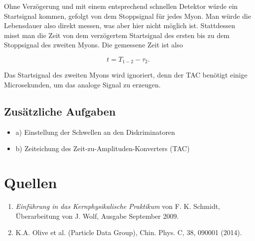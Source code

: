 \documentclass[a4paper,ngerman]{scrartcl}
\begin{document}
Ohne Verzögerung und mit einem entsprechend schnellen Detektor würde ein Startsignal kommen, gefolgt von dem Stoppsignal für jedes Myon. Man würde die Lebensdauer also direkt messen, was aber hier nicht möglich ist. Stattdessen misst man die Zeit von dem verzögertem Startsignal des ersten bis zu dem Stoppsignal des zweiten Myons. Die gemessene Zeit ist also

\begin{equation}
t = T_{1-2} - \tau_2 .
\end{equation}

Das Startsignal des zweiten Myons wird ignoriert, denn der TAC benötigt einige Microsekunden, um das analoge Signal zu erzeugen.



\subsection{Zusätzliche Aufgaben}

\begin{itemize}
\item a) Einstellung der Schwellen an den Diskriminatoren
\item b) Zeiteichung des Zeit-zu-Amplituden-Konverters (TAC)
\end{itemize}



\clearpage
\section{Quellen}
\begin{enumerate}
\item \emph{Einführung in das Kernphysikalische Praktikum} von F. K. Schmidt, 
  Überarbeitung von J. Wolf, Ausgabe September 2009. \label{ref:bb}
\item K.A. Olive et al. (Particle Data Group), Chin. Phys. C, 38, 090001 (2014). \label{ref:pdg14}
\end{enumerate}
\end{document}
